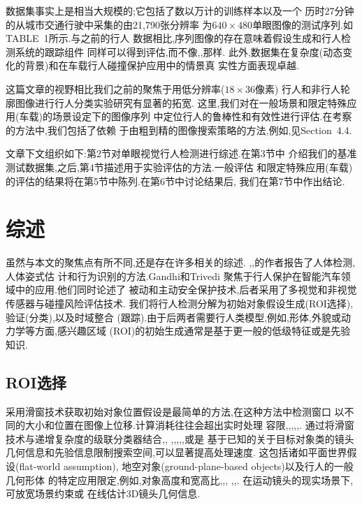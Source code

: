 \documentclass[10pt,letterpaper,journal,compsoc]{IEEEtran}
\begin{document}
数据集事实上是相当大规模的;它包括了数以万计的训练样本以及一个
历时27分钟的从城市交通行驶中采集的由21,790张分辨率
为$640\times480$单眼图像的测试序列.如TABLE~1所示.与之前的行人
数据相比,序列图像的存在意味着假设生成和行人检测系统的跟踪组件
同样可以得到评估,而不像\cite{bib28},\cite{bib46},\cite{bib49}那样.
此外,数据集在复杂度(动态变化的背景)和在车载行人碰撞保护应用中的情景真
实性方面表现卓越.

这篇文章的视野相比我们之前的聚焦于用低分辨率($18\times36像素$)
行人和非行人轮廓图像进行行人分类实验研究\cite{bib49}有显著的拓宽.
这里,我们对在一般场景和限定特殊应用(车载)的场景设定下的图像序列
中定位行人的鲁棒性和有效性进行评估.在考察的方法中,我们包括了依赖
于由粗到精的图像搜索策略的方法,例如,见Section~4.4.

文章下文组织如下:第2节对单眼视觉行人检测进行综述.在第3节中
介绍我们的基准测试数据集,之后,第4节描述用于实验评估的方法.一般评估
和限定特殊应用(车载)的评估的结果将在第5节中陈列.在第6节中讨论结果后,
我们在第7节中作出结论.
\section{综述}
虽然与本文的聚焦点有所不同,还是存在许多相关的综述.
\cite{bib21},\cite{bib47},\cite{bib57}的作者报告了人体检测,人体姿式估
计和行为识别的方法.Gandhi和Trivedi
\cite{bib20}聚焦于行人保护在智能汽车领域中的应用.他们同时论述了
被动和主动安全保护技术,后者采用了多视觉和非视觉传感器与碰撞风险评估技术.
我们将行人检测分解为初始对象假设生成(ROI选择),验证(分类),以及时域整合
(跟踪).由于后两者需要行人类模型,例如,形体,外貌或动力学等方面,感兴趣区域
(ROI)的初始生成通常是基于更一般的低级特征或是先验知识.
\subsection{ROI选择}
采用滑窗技术获取初始对象位置假设是最简单的方法,在这种方法中检测窗口
以不同的大小和位置在图像上位移.计算消耗往往会超出实时处理
容限\cite{bib11},\cite{bib12},\cite{bib48},\cite{bib53},\cite{bib60},\cite{bib68}.
通过将滑窗技术与递增复杂度的级联分类器结合\cite{bib45},\cite{bib52},\cite{bib63}
,\cite{bib71},\cite{bib74},\cite{bib76},\cite{bib80},\cite{bib83}或是
基于已知的关于目标对象类的镜头几何信息和先验信息限制搜索空间,可以显著提高处理速度.
这包括诸如平面世界假设(flat-world assumption),
地空对象(ground-plane-based objects)以及行人的一般几何形体
的特定应用限定,例如,对象高度和宽高比\cite{bib15},\cite{bib23},\cite{bib39},
\cite{bib50},\cite{bib62},\cite{bib82}.
在运动镜头的现实场景下,可放宽场景约束\cite{bib23}或
在线估计3D镜头几何信息\cite{bib39}.
\end{document}
